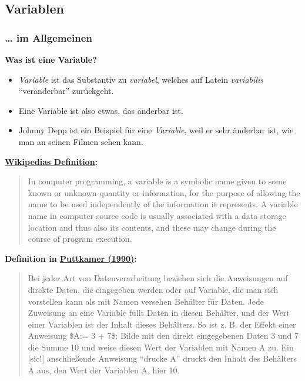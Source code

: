 
\subsection{\texorpdfstring{{Variablen}}{Variablen}}

\subsubsection{\texorpdfstring{{\ldots{} im
Allgemeinen}}{\ldots{} im Allgemeinen}}

\par\noindent\textbf{Was ist eine Variable?}

\begin{itemize}
\itemsep1pt\parskip0pt
\item
  {\emph{Variable} ist das Substantiv zu \emph{variabel}, welches auf
  Latein \emph{variabilis} ``veränderbar'' zurückgeht.}
\item
  {Eine Variable ist also etwas, das änderbar ist.}
\item
  {Johnny Depp ist ein Beispiel für eine \emph{Variable}, weil er sehr
  änderbar ist, wie man an seinen Filmen sehen kann.}
\end{itemize}



\par\noindent\textbf{\href{http://de.wikipedia.org/wiki/variable_(programming)}{Wikipedias
Definition}:}

\begin{quote}
In computer programming, a variable is a symbolic name given to some
known or unknown quantity or information, for the purpose of allowing
the name to be used independently of the information it represents. A
variable name in computer source code is usually associated with a data
storage location and thus also its contents, and these may change during
the course of program execution.
\end{quote}



\par\noindent\textbf{Definition in
\href{http://bibliography.lingpy.org?key=Puttkamer1990}{Puttkamer
(1990)}:}

\begin{quote}
Bei jeder Art von Datenverarbeitung beziehen sich die Anweisungen auf
direkte Daten, die eingegeben werden oder auf Variable, die man sich
vorstellen kann als mit Namen versehen Behälter für Daten. Jede
Zuweisung an eine Variable füllt Daten in diesen Behälter, und der Wert
einer Variablen ist der Inhalt dieses Behälters. So ist z. B. der Effekt
einer Anweisung \$A:= 3 + 7\$: Bilde mit den direkt eingegebenen Daten 3
und 7 die Summe 10 und weise diesen Wert der Variablen mit Namen A zu.
Ein {[}sic!{]} anschließende Anweisung ``drucke A'' druckt den Inhalt
des Behälters A aus, den Wert der Variablen A, hier 10.
\end{quote}




